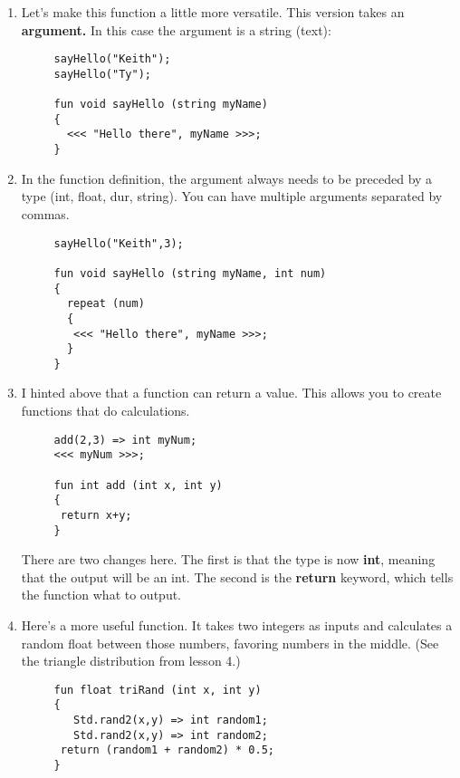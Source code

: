 \documentclass{article}
\begin{document}
\begin {enumerate}
\section{Arguments}
\item Let's make this function a little more versatile. This version takes an \textbf{argument.} In this case the argument is a string (text):

\begin{lstlisting}
     sayHello("Keith");
     sayHello("Ty");
 
     fun void sayHello (string myName)
     {
       <<< "Hello there", myName >>>;
     } 
\end{lstlisting}

\item In the function definition, the argument always needs to be preceded by a type (int, float, dur, string). You can have multiple arguments separated by commas.

\begin{lstlisting}
     sayHello("Keith",3);
 
     fun void sayHello (string myName, int num)
     {
       repeat (num)
       {
        <<< "Hello there", myName >>>;
       }
     }
\end{lstlisting}

\item I hinted above that a function can return a value. This allows you to create functions that do calculations.

\begin{lstlisting}
     add(2,3) => int myNum;
     <<< myNum >>>;
 
     fun int add (int x, int y)
     {
      return x+y;
     }
\end{lstlisting}

There are two changes here. The first is that the type is now \textbf{int}, meaning that the output will be an int. The second is the \textbf{return} keyword, which tells the function what to output.

\item Here's a more useful function. It takes two integers as inputs and calculates a random float between those numbers, favoring numbers in the middle. (See the triangle distribution from lesson 4.)

\begin{lstlisting}
     fun float triRand (int x, int y)
     {
     	Std.rand2(x,y) => int random1;
     	Std.rand2(x,y) => int random2;
      return (random1 + random2) * 0.5;
     }
\end{lstlisting}


\end{enumerate}
\end{document}
